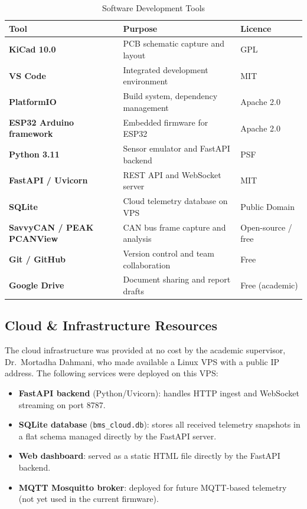 \begin{table}[H]
\centering
\caption{Software Development Tools}
\label{tab:software-tools}
\begin{tabular}{>{\bfseries}p{4.0cm} p{5.8cm} l}
\toprule
Tool & Purpose & Licence \\
\midrule
KiCad 10.0              & PCB schematic capture and layout        & GPL \\
VS Code                 & Integrated development environment      & MIT \\
PlatformIO              & Build system, dependency management     & Apache 2.0 \\
ESP32 Arduino framework & Embedded firmware for ESP32             & Apache 2.0 \\
Python 3.11             & Sensor emulator and FastAPI backend     & PSF \\
FastAPI / Uvicorn       & REST API and WebSocket server           & MIT \\
SQLite                  & Cloud telemetry database on VPS         & Public Domain \\
SavvyCAN / PEAK PCANView & CAN bus frame capture and analysis     & Open-source / free \\
Git / GitHub            & Version control and team collaboration  & Free \\
Google Drive            & Document sharing and report drafts      & Free (academic) \\
\bottomrule
\end{tabular}
\end{table}

\subsection{Cloud \& Infrastructure Resources}

The cloud infrastructure was provided at no cost by the academic supervisor, Dr.\ Mortadha Dahmani, who made available a Linux VPS with a public IP address. The following services were deployed on this VPS:

\begin{itemize}
    \item \textbf{FastAPI backend} (Python/Uvicorn): handles HTTP ingest and WebSocket streaming on port 8787.
    \item \textbf{SQLite database} (\texttt{bms\_cloud.db}): stores all received telemetry snapshots in a flat schema managed directly by the FastAPI server.
    \item \textbf{Web dashboard}: served as a static HTML file directly by the FastAPI backend.
    \item \textbf{MQTT Mosquitto broker}: deployed for future MQTT-based telemetry (not yet used in the current firmware).
\end{itemize}

